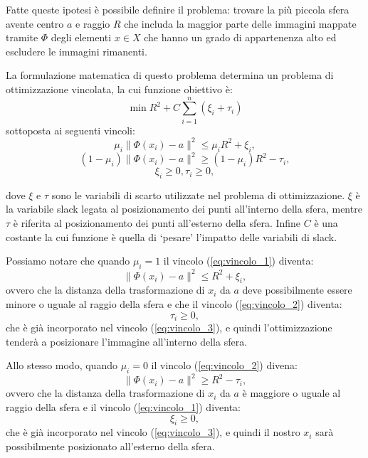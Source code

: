 \documentclass[a4paper,12pt]{report}
\begin{document}
\noindent Fatte queste ipotesi è possibile definire il problema: trovare la più piccola sfera avente centro $a$ e raggio $R$ che includa la maggior parte delle immagini mappate tramite $\Phi$ degli elementi $x\in X$ che hanno un grado di appartenenza alto ed escludere le immagini rimanenti.



La formulazione matematica di questo problema determina un problema di ottimizzazione vincolata, la cui funzione obiettivo è:
\begin{equation}
    \min R^2 + C\displaystyle\sum_{i=1}^{n}(\xi_i+\tau_i)
    \label{eq:Problema_di_partenza}
\end{equation}
sottoposta ai seguenti vincoli:
\begin{equation}
    \mu_i\|\Phi(x_i)-a\|^2\le\mu_iR^2 + \xi_i,
    \label{eq:vincolo_1}
\end{equation}
\begin{equation}
    (1-\mu_i)\|\Phi(x_i)-a\|^2 \ge (1-\mu_i)R^2 - \tau_i,
    \label{eq:vincolo_2}
\end{equation}
\begin{equation}
    \xi_i \ge 0, \tau_i \ge 0,
    \label{eq:vincolo_3}
\end{equation}


\noindent dove $\xi$ e $\tau$ sono le variabili di scarto utilizzate nel problema di ottimizzazione. $\xi$ è la variabile slack legata al posizionamento dei punti all'interno della sfera, mentre $\tau$ è riferita al posizionamento dei punti all'esterno della sfera. Infine $C$ è una costante la cui funzione è quella di `pesare' l'impatto delle variabili di slack.

Possiamo notare che quando $\mu_i = 1$ il vincolo (\ref{eq:vincolo_1}) diventa:
\begin{equation*}
    \|\Phi(x_i)-a\|^{2} \le R^2 + \xi_i,
\end{equation*}
ovvero che la distanza della trasformazione di $x_i$ da $a$ deve possibilmente essere minore o uguale al raggio della sfera e che il vincolo (\ref{eq:vincolo_2}) diventa:
\begin{equation*}
    \tau_i \ge 0,
\end{equation*}
che è già incorporato nel vincolo (\ref{eq:vincolo_3}), e quindi l'ottimizzazione tenderà a posizionare l'immagine all'interno della sfera.

Allo stesso modo, quando $\mu_i = 0$ il vincolo (\ref{eq:vincolo_2}) divena:
\begin{equation*}
    \|\Phi(x_i)-a\|^2 \ge R^2 - \tau_i,
\end{equation*}
ovvero che la distanza della trasformazione di $x_i$ da $a$ è maggiore o uguale al raggio della sfera e il vincolo (\ref{eq:vincolo_1}) diventa:
\begin{equation*}
    \xi_i \ge 0,
\end{equation*}
che è già incorporato nel vincolo (\ref{eq:vincolo_3}), e quindi il nostro $x_i$ sarà possibilmente posizionato all'esterno della sfera.
\end{document}
